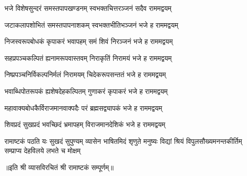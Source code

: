 
\twolineshloka
{भजे विशेषसुन्दरं समस्तपापखण्डनम्}
{स्वभक्तचित्तरञ्जनं सदैव राममद्वयम्}

\twolineshloka
{जटाकलापशोभितं समस्तपापनाशकम्}
{स्वभक्तभीतिभञ्जनं भजे ह राममद्वयम्}

\twolineshloka
{निजस्वरूपबोधकं कृपाकरं भवापहम्}
{समं शिवं निरञ्जनं भजे ह राममद्वयम्}

\twolineshloka
{सहप्रपञ्चकल्पितं ह्यनामरूपवास्तवम्}
{निराकृतिं निरामयं भजे ह राममद्वयम्}

\twolineshloka
{निष्प्रपञ्चनिर्विकल्पनिर्मलं निरामयम्}
{चिदेकरूपसन्ततं भजे ह राममद्वयम्}

\twolineshloka
{भवाब्धिपोतरूपकं ह्यशेषदेहकल्पितम्}
{गुणाकरं कृपाकरं भजे ह राममद्वयम्}

\twolineshloka
{महावाक्यबोधकैर्विराजमानवाक्पदैः}
{परं ब्रह्मसद्व्यापकं भजे ह राममद्वयम्}

\twolineshloka
{शिवप्रदं सुखप्रदं भवच्छिदं भ्रमापहम्}
{विराजमानदेशिकं भजे ह राममद्वयम्}

\fourlineindentedshloka
{रामाष्टकं पठति यः सुखदं सुपुण्यम्}
{व्यासेन भाषितमिदं शृणुते मनुष्यः}
{विद्यां श्रियं विपुलसौख्यमनन्तकीर्तिम्}
{सम्प्राप्य देहविलये लभते च मोक्षम्}
  
॥इति श्री व्यासविरचितं श्री रामाष्टकं सम्पूर्णम्॥